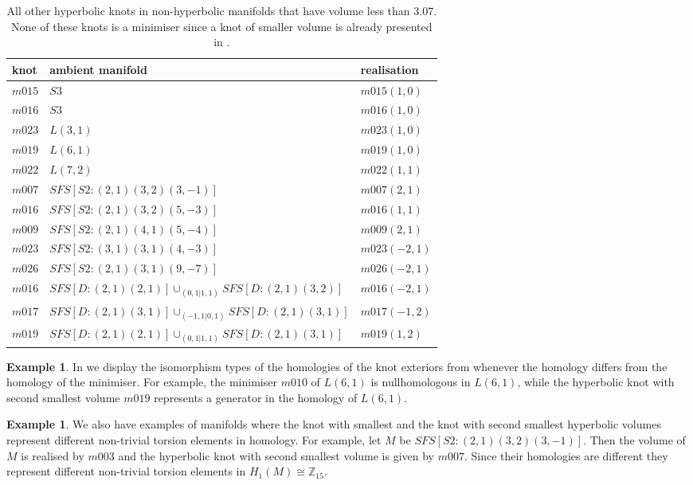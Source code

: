 \documentclass[a4paper]{gtart}
\theoremstyle{definition}
\newtheorem{example}[proposition]{Example}
\theoremstyle{remark}
\numberwithin{equation}{section}
\newcommand{\Z}{\mathbb{Z}}
\begin{document}
\begin{table}[htbp]
	\caption{All other hyperbolic knots in non-hyperbolic manifolds that have volume less than $3.07$. None of these knots is a minimiser since a knot of smaller volume is already presented in .}
	\label{tab:non_minimizers}
	\begin{tabular}{lll}
		knot & ambient manifold  & realisation\\
		\toprule	
		$m015$ & $S3$  & $m015(1, 0)$ \\
		$m016$ & $S3$  & $m016(1, 0)$ \\
        $m023$ & $L(3,1)$  & $m023(1, 0)$ \\
        $m019$ & $L(6,1)$  & $m019(1, 0)$ \\
		$m022$ & $L(7,2)$  & $m022(1, 1)$ \\		
		$m007$ & $SFS [S2: (2,1) (3,2) (3,-1)]$ &  $m007(2, 1)$ \\
        $m016$ & $SFS [S2: (2,1) (3,2) (5,-3)]$ &  $m016(1, 1)$ \\
		$m009$ & $SFS [S2: (2,1) (4,1) (5,-4)]$  & $m009(2, 1)$ \\
		$m023$ & $SFS [S2: (3,1) (3,1) (4,-3)]$  & $m023(-2, 1)$ \\
		$m026$ & $SFS [S2: (2,1) (3,1) (9,-7)]$  & $m026(-2, 1)$ \\
        $m016$ & $SFS [D: (2,1) (2,1)] \cup_{(0,1 | 1,1)} SFS [D: (2,1) (3,2)]$  & $m016(-2, 1)$ \\
        $m017$ & $SFS [D: (2,1) (3,1)] \cup_{(-1,1 | 0,1)} SFS [D: (2,1) (3,1)]$  & $m017(-1, 2)$ \\
        $m019$ & $SFS [D: (2,1) (2,1)] \cup_{(0,1 | 1,1)} SFS [D: (2,1) (3,1)]$  & $m019(1, 2)$ \\
		\bottomrule
	\end{tabular}
\end{table}

\begin{example}
In  we display the isomorphism types of the homologies of the knot exteriors from  whenever the homology differs from the homology of the minimiser. For example, the minimiser $m010$ of $L(6,1)$ is nullhomologous in $L(6,1)$, while the hyperbolic knot with second smallest volume $m019$ represents a generator in the homology of $L(6,1)$. 
\end{example}

\begin{example}
We also have examples of manifolds where the knot with smallest and the knot with second smallest hyperbolic volumes represent different non-trivial torsion elements in homology. For example, let $M$ be $SFS [S2: (2,1) (3,2) (3,-1)]$. Then the volume of $M$ is realised by $m003$ and the hyperbolic knot with second smallest volume is given by $m007$. Since their homologies are different they represent different non-trivial torsion elements in $H_1(M)\cong\Z_{15}$.
\end{example}
\end{document}
